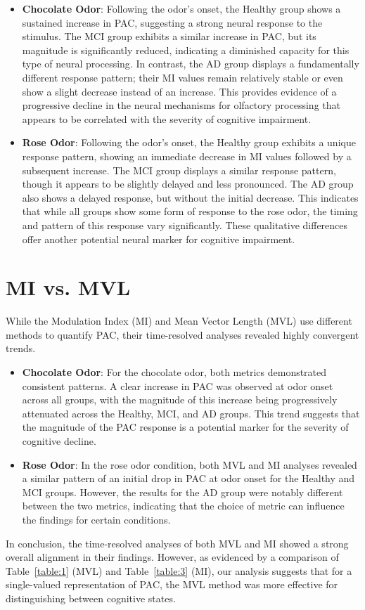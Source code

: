 \documentclass[hidelinks,12pt]{article}
\begin{document}
	\begin{itemize}
		\item \textbf{Chocolate Odor}: Following the odor's onset, the Healthy group shows a sustained increase in PAC, suggesting a strong neural response to the stimulus. The MCI group exhibits a similar increase in PAC, but its magnitude is significantly reduced, indicating a diminished capacity for this type of neural processing. In contrast, the AD group displays a fundamentally different response pattern; their MI values remain relatively stable or even show a slight decrease instead of an increase. This provides evidence of a progressive decline in the neural mechanisms for olfactory processing that appears to be correlated with the severity of cognitive impairment.
		
		\item \textbf{Rose Odor}: Following the odor's onset, the Healthy group exhibits a unique response pattern, showing an immediate decrease in MI values followed by a subsequent increase. The MCI group displays a similar response pattern, though it appears to be slightly delayed and less pronounced. The AD group also shows a delayed response, but without the initial decrease. This indicates that while all groups show some form of response to the rose odor, the timing and pattern of this response vary significantly. These qualitative differences offer another potential neural marker for cognitive impairment.
	\end{itemize}

	
	\section{MI vs. MVL}
	While the Modulation Index (MI) and Mean Vector Length (MVL) use different methods to quantify PAC, their time-resolved analyses revealed highly convergent trends.
	\begin{itemize}
		\item \textbf{Chocolate Odor}: For the chocolate odor, both metrics demonstrated consistent patterns. A clear increase in PAC was observed at odor onset across all groups, with the magnitude of this increase being progressively attenuated across the Healthy, MCI, and AD groups. This trend suggests that the magnitude of the PAC response is a potential marker for the severity of cognitive decline.
		
		\item \textbf{Rose Odor}: In the rose odor condition, both MVL and MI analyses revealed a similar pattern of an initial drop in PAC at odor onset for the Healthy and MCI groups. However, the results for the AD group were notably different between the two metrics, indicating that the choice of metric can influence the findings for certain conditions.
		
	\end{itemize}
	In conclusion, the time-resolved analyses of both MVL and MI showed a strong overall alignment in their findings. However, as evidenced by a comparison of Table~\ref{table:1} (MVL) and Table~\ref{table:3} (MI), our analysis suggests that for a single-valued representation of PAC, the MVL method was more effective for distinguishing between cognitive states.
	
\end{document}
